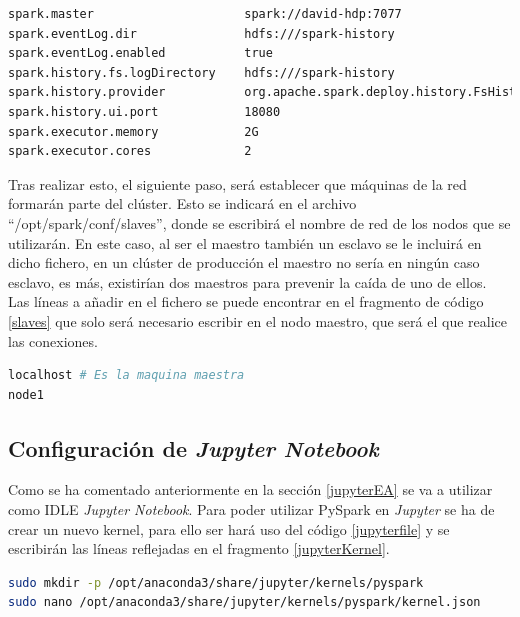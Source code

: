 \begin{lstlisting}[label=sparkDefaults,language=sh,frame=single,caption=Contenido del fichero ``spark-defaults.conf'' de configuración de \textit{Apache Spark}.]
spark.master                     spark://david-hdp:7077
spark.eventLog.dir               hdfs:///spark-history
spark.eventLog.enabled           true
spark.history.fs.logDirectory    hdfs:///spark-history
spark.history.provider           org.apache.spark.deploy.history.FsHistoryProvider
spark.history.ui.port            18080
spark.executor.memory            2G
spark.executor.cores             2
\end{lstlisting}

Tras realizar esto, el siguiente paso, será establecer que máquinas de la red formarán parte del clúster. Esto se indicará en el archivo  ``/opt/spark/conf/slaves'', donde se escribirá el nombre de red de los nodos que se utilizarán. En este caso, al ser el maestro también un esclavo se le incluirá en dicho fichero, en un clúster de producción el maestro no sería en ningún caso esclavo, es más, existirían dos maestros para prevenir la caída de uno de ellos. Las líneas a añadir en el fichero se puede encontrar en el fragmento de código \ref{slaves} que solo será necesario escribir en el nodo maestro, que será el que realice las conexiones.

\begin{lstlisting}[label=slaves,language=sh,frame=single,caption=Líneas a añadir en el fichero ``slaves'' para establecer las máquinas a utilizar en el clúster.]
localhost # Es la maquina maestra
node1
\end{lstlisting}

\clearpage
\subsection{Configuración de \textit{Jupyter Notebook}}
Como se ha comentado anteriormente en la sección \ref{jupyterEA} se va a utilizar como \gls{IDLE} \textit{Jupyter Notebook}. Para poder utilizar PySpark en \textit{Jupyter} se ha de crear un nuevo kernel, para ello ser hará uso del código \ref{jupyterfile} y se escribirán las líneas reflejadas en el fragmento \ref{jupyterKernel}. 

\begin{lstlisting}[label=jupyterfile,language=sh,frame=single,caption=Comando para generar el kernel \textit{Jupyter} para PySpark.]
sudo mkdir -p /opt/anaconda3/share/jupyter/kernels/pyspark
sudo nano /opt/anaconda3/share/jupyter/kernels/pyspark/kernel.json
\end{lstlisting}

